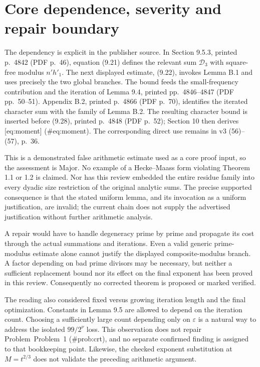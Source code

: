 \documentclass[10pt]{article}
\begin{document}
\section*{Core dependence, severity and repair boundary}
The dependency is explicit in the publisher source. In Section 9.5.3, printed p. 4842 (PDF p. 46), equation (9.21) defines the relevant sum \(\mathcal D_3\) with square-free modulus \(n'h'_1\). The next displayed estimate, (9.22), invokes Lemma B.1 and uses precisely the two global branches. The bound feeds the small-frequency contribution and the iteration of Lemma 9.4, printed pp. 4846–4847 (PDF pp. 50–51). Appendix B.2, printed p. 4866 (PDF p. 70), identifies the iterated character sum with the family of Lemma B.2. The resulting character bound is inserted before (9.28), printed p. 4848 (PDF p. 52); Section 10 then derives [eq:moment] (\#eq:moment). The corresponding direct use remains in v3 (56)–(57), p. 36.\par
This is a demonstrated false arithmetic estimate used as a core proof input, so the assessment is Major. No example of a Hecke–Maass form violating Theorem 1.1 or 1.2 is claimed. Nor has this review embedded the entire residue family into every dyadic size restriction of the original analytic sums. The precise supported consequence is that the stated uniform lemma, and its invocation as a uniform justification, are invalid; the current chain does not supply the advertised justification without further arithmetic analysis.\par
A repair would have to handle degeneracy prime by prime and propagate its cost through the actual summations and iterations. Even a valid generic prime-modulus estimate alone cannot justify the displayed composite-modulus branch. A factor depending on bad prime divisors may be necessary, but neither a sufficient replacement bound nor its effect on the final exponent has been proved in this review. Consequently no corrected theorem is proposed or marked verified.\par
The reading also considered fixed versus growing iteration length and the final optimization. Constants in Lemma 9.5 are allowed to depend on the iteration count. Choosing a sufficiently large count depending only on \(\varepsilon\) is a natural way to address the isolated \(99/2^\nu\) loss. This observation does not repair Problem Problem 1 (\#prob:crt), and no separate confirmed finding is assigned to that bookkeeping point. Likewise, the checked exponent substitution at \(M=t^{2/3}\) does not validate the preceding arithmetic argument.\par
\end{document}
